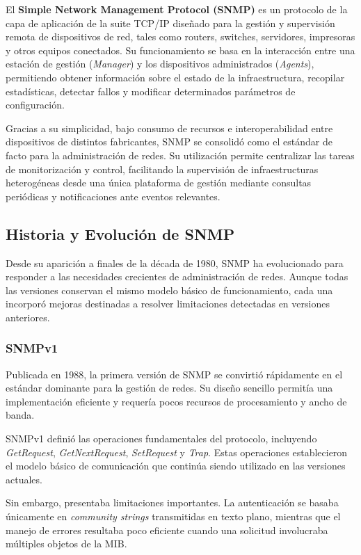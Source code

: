 El \textbf{Simple Network Management Protocol (SNMP)} es un protocolo de la capa de aplicación de la suite TCP/IP diseñado para la gestión y supervisión remota de dispositivos de red, tales como routers, switches, servidores, impresoras y otros equipos conectados. Su funcionamiento se basa en la interacción entre una estación de gestión (\textit{Manager}) y los dispositivos administrados (\textit{Agents}), permitiendo obtener información sobre el estado de la infraestructura, recopilar estadísticas, detectar fallos y modificar determinados parámetros de configuración.

Gracias a su simplicidad, bajo consumo de recursos e interoperabilidad entre dispositivos de distintos fabricantes, SNMP se consolidó como el estándar de facto para la administración de redes. Su utilización permite centralizar las tareas de monitorización y control, facilitando la supervisión de infraestructuras heterogéneas desde una única plataforma de gestión mediante consultas periódicas y notificaciones ante eventos relevantes.

\subsection{Historia y Evolución de SNMP}

Desde su aparición a finales de la década de 1980, SNMP ha evolucionado para responder a las necesidades crecientes de administración de redes. Aunque todas las versiones conservan el mismo modelo básico de funcionamiento, cada una incorporó mejoras destinadas a resolver limitaciones detectadas en versiones anteriores.

\subsubsection{SNMPv1}

Publicada en 1988, la primera versión de SNMP se convirtió rápidamente en el estándar dominante para la gestión de redes. Su diseño sencillo permitía una implementación eficiente y requería pocos recursos de procesamiento y ancho de banda.

SNMPv1 definió las operaciones fundamentales del protocolo, incluyendo \textit{GetRequest}, \textit{GetNextRequest}, \textit{SetRequest} y \textit{Trap}. Estas operaciones establecieron el modelo básico de comunicación que continúa siendo utilizado en las versiones actuales.

Sin embargo, presentaba limitaciones importantes. La autenticación se basaba únicamente en \textit{community strings} transmitidas en texto plano, mientras que el manejo de errores resultaba poco eficiente cuando una solicitud involucraba múltiples objetos de la MIB.

